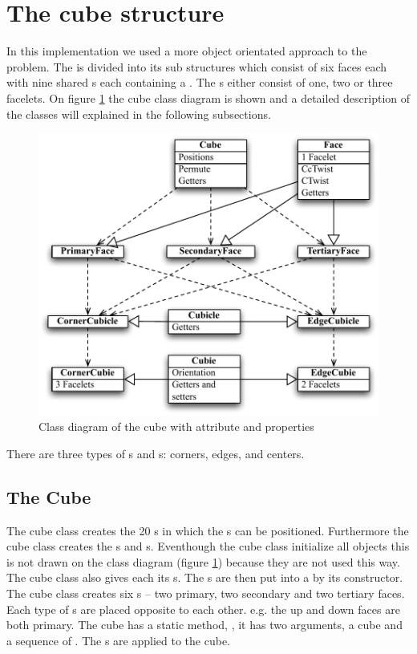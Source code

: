 \section{The cube structure}
In this implementation we used a more object orientated approach to the problem.
The \rubik{} is divided into its sub structures which consist of six faces each with nine shared \cubicle{}s each containing a \cubie{}. The \cubie{}s either consist of one, two or three facelets. On figure \ref{fig:cubeClassDiagram} the cube class diagram is shown and a detailed description of the classes will explained in the following subsections.

\begin{figure}[htbp]
	\centering
		\includegraphics{input/pics/cubeClassDiagram.pdf}
	\caption{Class diagram of the cube with attribute and properties}
	\label{fig:cubeClassDiagram}
\end{figure}


There are three types of \cpiece{}s and \cubicle{}s: corners, edges, and centers. 

\subsection{The Cube}
The cube class creates the 20 \cubicle{}s in which the \cpiece{}s can be positioned. Furthermore the cube class creates the \face{}s and \cubie{}s. Eventhough the cube class initialize all objects this is not drawn on the class diagram (figure \ref{fig:cubeClassDiagram}) because they are not used this way. The cube class also gives each \cpiece{} its \facelet{}s. The \cubicle{}s are then put into a \face{} by its constructor. The cube class creates six \face{}s -- two primary, two secondary and two tertiary faces. Each type of \face{}s are placed opposite to each other. e.g. the up and down faces are both primary. The cube has a static method, , it has two arguments, a cube and a sequence of \twist{}. The \twist{}s are applied to the cube.

